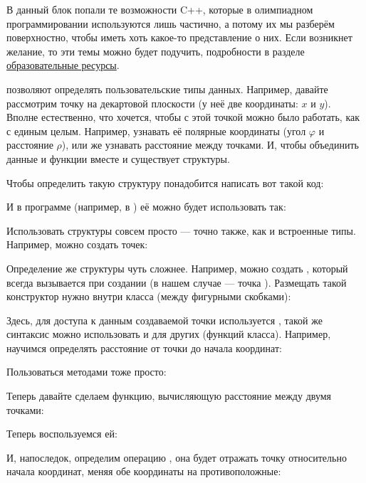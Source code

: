 В данный блок попали те возможности C++, которые в олимпиадном программировании используются лишь частично, а потому их мы разберём поверхностно, чтобы иметь хоть какое-то представление о них. Если возникнет желание, то эти темы можно будет подучить, подробности в разделе \hyperlink{0.5}{образовательные ресурсы}.


 позволяют определять пользовательские типы данных. Например, давайте рассмотрим точку на декартовой плоскости (у неё две координаты: $x$ и $y$). Вполне естественно, что хочется, чтобы с этой точкой можно было работать, как с единым целым. Например, узнавать её полярные координаты (угол $\varphi$ и расстояние $\rho$), или же узнавать расстояние между точками. И, чтобы объединить данные и функции вместе и существует структуры.

Чтобы определить такую структуру понадобится написать вот такой код:


И в программе (например, в ) её можно будет использовать так:


Использовать структуры совсем просто — точно также, как и встроенные типы. Например, можно создать  точек:


Определение же структуры чуть сложнее. Например, можно создать , который всегда вызывается при создании  (в нашем случае — точка ). Размещать такой конструктор нужно внутри класса (между фигурными скобками):


Здесь, для доступа к данным создаваемой точки используется , такой же синтаксис можно использовать и для других  (функций класса). Например, научимся определять расстояние от точки до начала координат:


Пользоваться методами тоже просто:


Теперь давайте сделаем функцию, вычисляющую расстояние между двумя точками:


Теперь воспользуемся ей:


И, напоследок, определим операцию , она будет отражать точку относительно начала координат, меняя обе координаты на противоположные:

